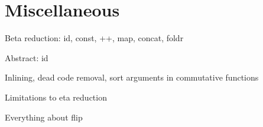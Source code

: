 

\section{Miscellaneous}

Beta reduction: id, const, ++, map, concat, foldr

Abstract: id

Inlining, dead code removal, sort arguments in commutative functions

Limitations to eta reduction

Everything about flip



